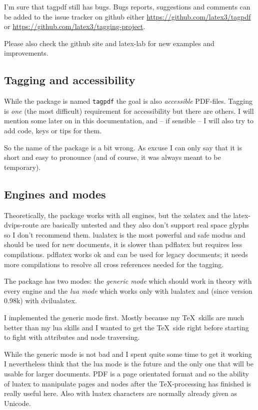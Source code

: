 \documentclass[bibliography=totoc,a4paper]{article}
\newcommand\pkg[1]{\texttt{#1}}
\newcommand\PDF{PDF}
\begin{document}
I'm sure that tagpdf still has bugs. Bugs reports, suggestions and comments 
can be added to the issue tracker on github either 
\url{https://github.com/latex3/tagpdf} or
\url{https://github.com/latex3/tagging-project}. 

Please also check the github site and latex-lab for new examples and improvements.

\subsection{Tagging and accessibility}

While the package is named \pkg{tagpdf} the goal is also \emph{accessible} 
\PDF{}-files. Tagging is \emph{one} (the most difficult) requirement for 
accessibility but there are others. I will mention some later on in this 
documentation, and -- if sensible -- I will also try to add code, keys or 
tips for them. 

So the name of the package is a bit wrong. As excuse I can only say that it 
is short and easy to pronounce (and of course, it was always meant to be temporary). 


\subsection{Engines and modes}

 Theoretically, the package works with all engines, but the xelatex and the 
latex-dvips-route are basically untested and they also don't support real 
space glyphs so I don't recommend them. lualatex is the most powerful and 
safe modus and should be used for new documents, it is slower than pdflatex 
but requires less compilations. pdflatex works ok and can be used for legacy 
documents; it needs more compilations to resolve all cross references needed 
for the tagging. 

The package has two modes: the \emph{generic mode} which should work in 
theory with every engine and the \emph{lua mode} which works only with 
lualatex and (since version 0.98k) with dvilualatex. 

I implemented the generic mode first. Mostly because my \TeX\ skills are much 
better than my lua skills and I wanted to get the \TeX\ side right before 
starting to fight with attributes and node traversing. 

While the generic mode is not bad and I spent quite some time to get it 
working I nevertheless think that the lua mode is the future and the only one 
that will be usable for larger documents. \PDF{} is a page orientated format 
and so the ability of luatex to manipulate pages and nodes after the 
\TeX-processing has finished is really useful here. Also with luatex characters are 
normally already given as Unicode. 
\end{document}
